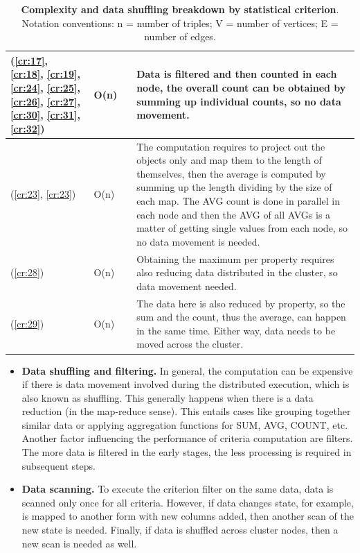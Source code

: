 \begin{table}[t]
\begin{tabularx}{\linewidth}{>{\scriptsize}p{1.5cm}|>{\scriptsize}p{3.9cm}>{\scriptsize}p{0.2cm}|>{\scriptsize}p{8.2cm}}
 \\
\hline
   (\ref{cr:17}, \ref{cr:18}, \ref{cr:19}, \ref{cr:24}, \ref{cr:25}, \ref{cr:26}, \ref{cr:27}, \ref{cr:30}, \ref{cr:31}, \ref{cr:32}) & 
  O(n) & & 
  Data is filtered and then counted in each node, the overall count can be obtained by summing up individual counts, so no data movement.
 \\
\hline
  (\ref{cr:23}, \ref{cr:23}) & 
  O(n) & & 
  The computation requires to project out the objects only and map them to the length of themselves, then the average is computed by summing up the length dividing by the size of each map. The AVG count is done in parallel in each node and then the AVG of all AVGs is a matter of getting single values from each node, so no data movement is needed.
 \\
\hline
  (\ref{cr:28}) & 
  O(n) & & 
  Obtaining the maximum per property requires also reducing data distributed in the cluster, so data movement needed.
 \\
\hline
  (\ref{cr:29}) & 
  O(n) & & 
  The data here is also reduced by property, so the sum and the count, thus the average, can happen in the same time. Either way, data needs to be moved across the cluster.
 \\
\hline
\end{tabularx}
\caption{\textbf{Complexity and data shuffling breakdown by statistical criterion}.
Notation conventions: n = number of triples; V = number of vertices; E = number of edges.}
\label{tab:criteriacomplexity}
\end{table}

\begin{itemize}
\item \textbf{Data shuffling and filtering.} In general, the computation can be expensive if there is data movement involved during the distributed execution, which is also known as shuffling. 
This generally happens when there is a data reduction (in the map-reduce sense). This entails cases like grouping together similar data or applying aggregation functions for SUM, AVG, COUNT, etc. 
Another factor influencing the performance of criteria computation are filters. The more data is filtered in the early stages, the less processing is required in subsequent steps.

\item \textbf{Data scanning.} To execute the criterion filter on the same data, data is scanned only once for all criteria. 
However, if data changes state, for example, is mapped to another form with new columns added, then another scan of the new state is needed.
Finally, if data is shuffled across cluster nodes, then a new scan is needed as well.
\end{itemize}

